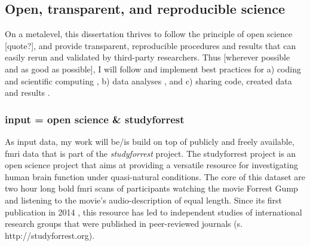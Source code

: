 \subsection{Open, transparent, and reproducible science}
%
%
On a metalevel, this dissertation thrives to follow the principle of open
science [quote?], and provide
transparent, reproducible procedures and results \citep{poldrack2017scanning}
that can easily rerun and validated by third-party researchers.
Thus [wherever possible and as good as possible], I will follow and implement
best practices for a) coding and scientific computing \citep{wilson2014best}, b)
data analyses \citep{nichols2017best}, and c) sharing code, created data and
results \citep{eglen2017toward, nichols2017best}.


\subsubsection{input = open science \& studyforrest}


As input data, my work will be/is build on top of publicly and freely available,
\ac{fmri} data that is part of the \textit{studyforrest} project.
%
The studyforrest project is an open science project that aims at providing a
versatile resource for investigating human brain function under quasi-natural
conditions.
%
The core of this dataset are two hour long \ac{bold} \ac{fmri} scans of
participants watching the movie Forrest Gump and listening to the movie's
audio-description of equal length.
%
Since its first publication in 2014 \citep{hanke2014audiomovie}, this resource
has led to independent studies of international research groups that were
published in peer-reviewed journals (s. http://studyforrest.org).

